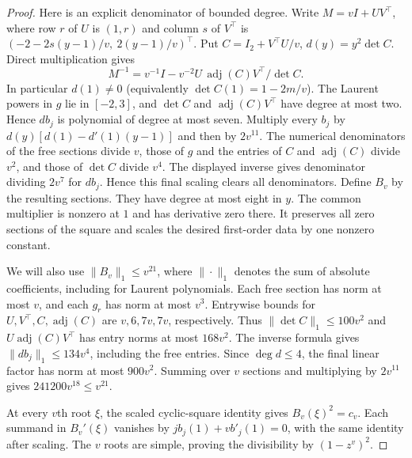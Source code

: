 \documentclass[11pt]{article}
\begin{document}
\begin{proof}
Here is an explicit denominator of bounded degree. Write $M=vI+UV^\top$, where row $r$ of $U$ is $(1,r)$ and column $s$ of $V^\top$ is $(-2-2s(y-1)/v,\ 2(y-1)/v)^\top$. Put $C=I_2+V^\top U/v$, $d(y)=y^2\det C$. Direct multiplication gives
\[
 M^{-1}=v^{-1}I-v^{-2}U\,\operatorname{adj}(C)V^\top/\det C.
\]
In particular $d(1)\ne0$ (equivalently $\det C(1)=1-2m/v$). The Laurent powers in $g$ lie in $[-2,3]$, and $\det C$ and $\operatorname{adj}(C)V^\top$ have degree at most two. Hence $d b_j$ is polynomial of degree at most seven. Multiply every $b_j$ by $d(y)[d(1)-d'(1)(y-1)]$ and then by $2v^{11}$. The numerical denominators of the free sections divide $v$, those of $g$ and the entries of $C$ and $\operatorname{adj}(C)$ divide $v^2$, and those of $\det C$ divide $v^4$. The displayed inverse gives denominator dividing $2v^7$ for $db_j$. Hence this final scaling clears all denominators. Define $B_v$ by the resulting sections. They have degree at most eight in $y$. The common multiplier is nonzero at $1$ and has derivative zero there. It preserves all zero sections of the square and scales the desired first-order data by one nonzero constant.

We will also use $\|B_v\|_1\leq v^{21}$, where $\|\cdot\|_1$ denotes the sum of absolute coefficients, including for Laurent polynomials. Each free section has norm at most $v$, and each $g_r$ has norm at most $v^3$. Entrywise bounds for $U,V^\top,C,\operatorname{adj}(C)$ are $v,6,7v,7v$, respectively. Thus $\|\det C\|_1\leq 100v^2$ and $U\operatorname{adj}(C)V^\top$ has entry norms at most $168v^2$. The inverse formula gives $\|db_j\|_1\leq134v^4$, including the free entries. Since $\deg d\leq4$, the final linear factor has norm at most $900v^2$. Summing over $v$ sections and multiplying by $2v^{11}$ gives $241200v^{18}\leq v^{21}$.

At every $v$th root $\xi$, the scaled cyclic-square identity gives $B_v(\xi)^2=c_v$. Each summand in $B_v'(\xi)$ vanishes by $j b_j(1)+v b'_j(1)=0$, with the same identity after scaling. The $v$ roots are simple, proving the divisibility by $(1-z^v)^2$.


\end{proof}
\end{document}
